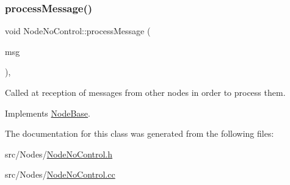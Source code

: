 \subsubsection{\texorpdfstring{process\+Message()}{processMessage()}}
{\footnotesize\ttfamily void Node\+No\+Control\+::process\+Message (\begin{DoxyParamCaption}\item[{c\+Message $\ast$}]{msg }\end{DoxyParamCaption})\hspace{0.3cm}{\ttfamily [private]}, {\ttfamily [virtual]}}



Called at reception of messages from other nodes in order to process them. 



Implements \hyperlink{class_node_base_ae70b168f2bc7407c249594b1c614301c}{Node\+Base}.



The documentation for this class was generated from the following files\+:\begin{DoxyCompactItemize}
\item 
src/\+Nodes/\hyperlink{_node_no_control_8h}{Node\+No\+Control.\+h}\item 
src/\+Nodes/\hyperlink{_node_no_control_8cc}{Node\+No\+Control.\+cc}\end{DoxyCompactItemize}
